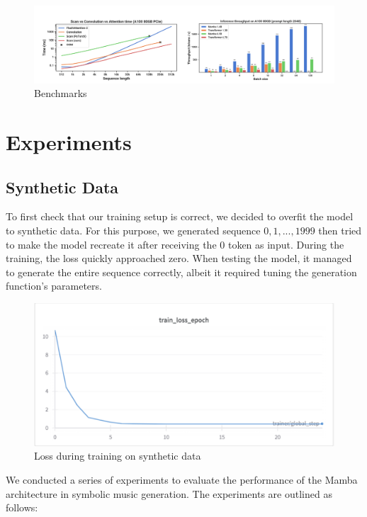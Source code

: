 \documentclass[conference]{IEEEtran}
\begin{document}
\begin{figure}[!htbp]
    \centering \includegraphics[width=\linewidth]{../assets/results.png}
    \caption{Benchmarks \cite{mamba}}
    \label{fig:mamba}
\end{figure}

\section{Experiments}
\subsection{Synthetic Data}
To first check that our training setup is correct, we decided to overfit the model to synthetic data. For this purpose, we generated sequence $0, 1, ..., 1999$ then tried to make the model recreate it after receiving the 0 token as input. During the training, the loss quickly approached zero. When testing the model, it managed to generate the entire sequence correctly, albeit it required tuning the generation function's parameters.

\begin{figure}[!htbp]
    \centering \includegraphics[width=\linewidth]{../assets/synth_data_train.png}
    \caption{ Loss during training on synthetic data}
    \label{fig:synth}
\end{figure}

We conducted a series of experiments to evaluate the performance of the Mamba architecture in symbolic music generation. The experiments are outlined as follows:
\end{document}
